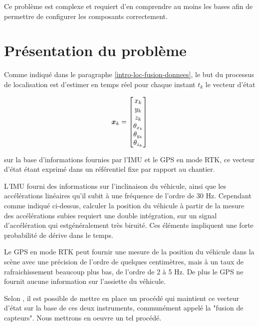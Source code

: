 \documentclass[12pt,a4paper]{report}
\begin{document}
\para Ce problème est complexe et requiert d'en comprendre au moins les bases afin de permettre de configurer les composants correctement.

	\section{Présentation du problème}
	Comme indiqué dans le paragraphe \ref{intro-loc-fusion-donnees}, le but du processus de localisation est d'estimer en temps réel pour chaque instant $t_k$ le vecteur d'état 
	
	\begin{equation}	
	\boldsymbol{x}_k = \begin{bmatrix}
	x_k \\ y_k \\ z_k \\ \theta_{x_k} \\ \theta_{y_k} \\ \theta_{z_k}
	\end{bmatrix}
	\end{equation}
	\newline
	
	sur la base d'informations fournies par l'IMU et le GPS en mode RTK, ce vecteur d'état étant exprimé dans un référentiel fixe par rapport au chantier.
	
	\para L'IMU fourni des informations sur l'inclinaison du véhicule, ainsi que les accélérations linéaires qu'il subit à une fréquence de l'ordre de 30 Hz. Cependant comme indiqué ci-dessus, calculer la position du véhicule à partir de la mesure des accélérations subies requiert une double intégration, sur un signal d'accélération qui estgénéralement très biruité. Ces éléments impliquent une forte probabilité de dérive dans le temps.
	
	\para Le GPS en mode RTK peut fournir une mesure de la position du véhicule dans la scène avec une précision de l'ordre de quelques centimètres, mais à un taux de rafraichissement beaucoup plus bas, de l'ordre de 2 à 5 Hz. De plus le GPS ne fournit aucune information sur l'assiette du véhicule.
	
	
	
	\para Selon \cite{gustavsson_uav_2015}, il est possible de mettre en place un procédé qui maintient ce vecteur d'état sur la base de ces deux instruments, communément appelé la "fusion de capteurs". Nous mettrons en oeuvre un tel procédé.
	
\end{document}
